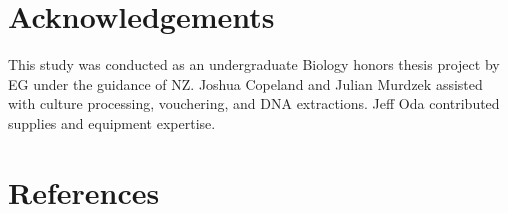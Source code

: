 \documentclass[fleqn,10pt,lineno]{wlpeerj} %
\begin{document}
\hypertarget{acknowledgements}{%
\section*{Acknowledgements}\label{acknowledgements}}

This study was conducted as an undergraduate Biology honors thesis project by EG under the guidance of NZ. Joshua Copeland and Julian Murdzek assisted with culture processing, vouchering, and DNA extractions. Jeff Oda contributed supplies and equipment expertise.

\hypertarget{references}{%
\section*{References}\label{references}}
\end{document}

